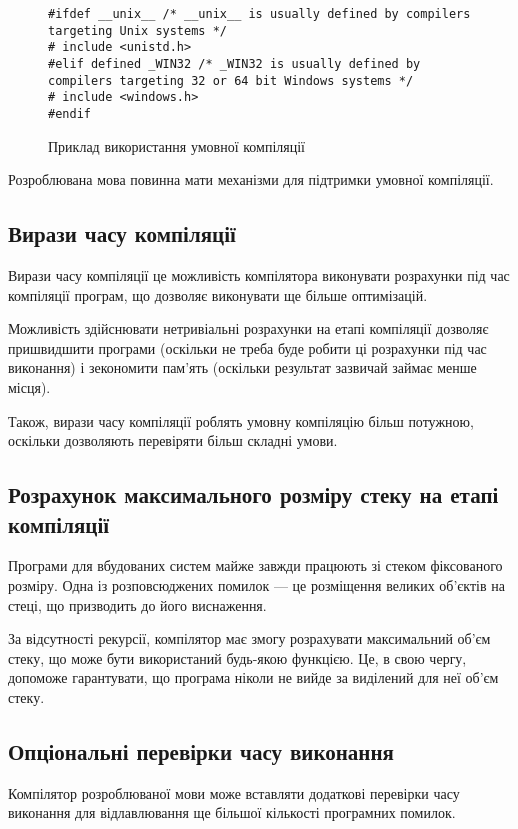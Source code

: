 \documentclass[main.tex]{subfiles}
\begin{document}
\begin{figure}[h]
  \centering
  \begin{verbatim}
#ifdef __unix__ /* __unix__ is usually defined by compilers targeting Unix systems */
# include <unistd.h>
#elif defined _WIN32 /* _WIN32 is usually defined by compilers targeting 32 or 64 bit Windows systems */
# include <windows.h>
#endif
  \end{verbatim}
  \caption{Приклад використання умовної компіляції}
  \label{conditional-compilation}
\end{figure}

Розроблювана мова повинна мати механізми для підтримки умовної компіляції.

\subsection{Вирази часу компіляції}
Вирази часу компіляції це можливість компілятора виконувати розрахунки під час компіляції програм, що дозволяє виконувати ще більше оптимізацій.

Можливість здійснювати нетривіальні розрахунки на етапі компіляції дозволяє пришвидшити програми (оскільки не треба буде робити ці розрахунки під час виконання) і зекономити пам'ять (оскільки результат зазвичай займає менше місця).

Також, вирази часу компіляції роблять умовну компіляцію більш потужною, оскільки дозволяють перевіряти більш складні умови.

\subsection{Розрахунок максимального розміру стеку на етапі компіляції}
Програми для вбудованих систем майже завжди працюють зі стеком фіксованого розміру. Одна із розповсюджених помилок --- це розміщення великих об'єктів на стеці, що призводить до його виснаження.

За відсутності рекурсії, компілятор має змогу розрахувати максимальний об'єм стеку, що може бути використаний будь-якою функцією. Це, в свою чергу, допоможе гарантувати, що програма ніколи не вийде за виділений для неї об'єм стеку.

\subsection{Опціональні перевірки часу виконання}
Компілятор розроблюваної мови може вставляти додаткові перевірки часу виконання для відлавлювання ще більшої кількості програмних помилок.
\end{document}
